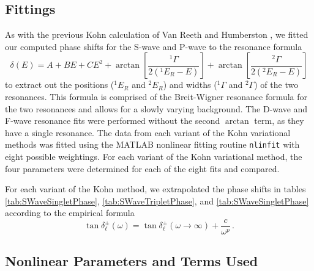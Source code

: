 \documentclass[preprint,showpacs,preprintnumbers,amsmath,amssymb]{revtex4}
\begin{document}
\subsection{Fittings}
As with the previous Kohn calculation of Van Reeth and Humberston \cite{VanReeth2004}, we fitted our computed phase shifts for the S-wave and P-wave to the resonance formula
\begin{equation}
\label{eq:ResonanceFit}
\delta(E) = A + B E + C E^2 + \arctan \left[ \frac{^1\Gamma}{2(^1E_R - E)} \right] + \arctan \left[ \frac{^2\Gamma}{2(^2E_R - E)} \right]
\end{equation}
to extract out the positions ($^1E_R$ and $^2E_R$) and widths
($^1\Gamma$ and $^2\Gamma$) of the two resonances. 
This formula is comprised of the Breit-Wigner resonance
formula for the two resonances and allows for a slowly varying
background. The D-wave and F-wave resonance fits were performed without the second $\arctan$ term, as they have a single resonance. 
The data from each variant of the Kohn variational methods was fitted using the MATLAB nonlinear fitting routine \texttt{nlinfit} with eight possible weightings.
For each variant of the Kohn variational method, the four parameters were determined for each of the eight fits and compared.

For each variant of the Kohn method, we extrapolated the phase shifts in tables \ref{tab:SWaveSingletPhase}, \ref{tab:SWaveTripletPhase}, and \ref{tab:SWaveSingletPhase} according to the empirical formula \cite{VanReeth2003}
\begin{equation}
\label{eq:Extrap}
\tan\delta_\ell^\pm(\omega) = \tan\delta_\ell^\pm(\omega\to\infty) + \frac{c}{\omega^p}\, .
\end{equation}


\subsection{Nonlinear Parameters and Terms Used}
\label{sec:Parameters}
\end{document}
